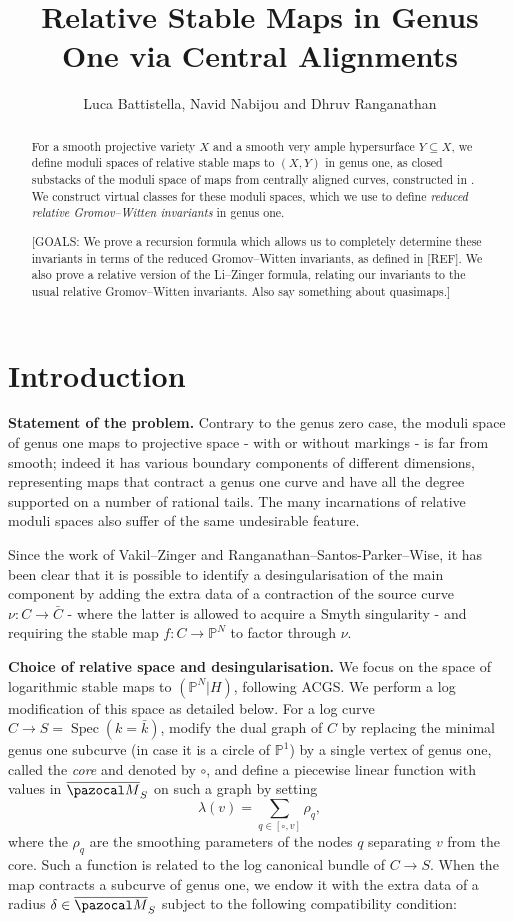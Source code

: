 \documentclass[11pt]{amsart}
\title[Genus One Reduced Relative Invariants]{Relative Stable Maps in Genus One via Central Alignments}
\author{Luca Battistella, Navid Nabijou and Dhruv Ranganathan}
\date{\thismonthyear}
\newcommand{\PP}{\mathbb P}
\renewcommand{\to}{\rightarrow}
\newcommand{\Spec}{\operatorname{Spec}}
\theoremstyle{definition}
\theoremstyle{definition}
\begin{document}
\begin{abstract} For a smooth projective variety $X$ and a smooth very ample hypersurface $Y \subseteq X$, we define moduli spaces of relative stable maps to $(X,Y)$ in genus one, as closed substacks of the moduli space of maps from centrally aligned curves, constructed in \cite{RSPW}. We construct virtual classes for these moduli spaces, which we use to define \emph{reduced relative Gromov--Witten invariants} in genus one.

[GOALS: We prove a recursion formula which allows us to completely determine these invariants in terms of the reduced Gromov--Witten invariants, as defined in [REF]. We also prove a relative version of the Li--Zinger formula, relating our invariants to the usual relative Gromov--Witten invariants. Also say something about quasimaps.]
\end{abstract}

\maketitle

\appendixtitletocoff
\tableofcontents

\section{Introduction}

\textbf{Statement of the problem.} Contrary to the genus zero case, the moduli space of genus one maps to projective space - with or without markings - is far from smooth; indeed it has various boundary components of different dimensions, representing maps that contract a genus one curve and have all the degree supported on a number of rational tails. The many incarnations of relative moduli spaces also suffer of the same undesirable feature.

Since the work of Vakil--Zinger and Ranganathan--Santos-Parker--Wise, it has been clear that it is possible to identify a desingularisation of the main component by adding the extra data of a contraction of the source curve $\nu\colon C\to \bar{C}$ - where the latter is allowed to acquire a Smyth singularity - and requiring the stable map $f\colon C\to \PP^N$ to factor through $\nu$.

\textbf{Choice of relative space and desingularisation.} We focus on the space of logarithmic stable maps to $(\PP^N|H)$, following ACGS. We perform a log modification of this space as detailed below. For a log curve $C\to S=\Spec(k=\bar k)$, modify the dual graph of $C$ by replacing the minimal genus one subcurve (in case it is a circle of $\PP^1$) by a single vertex of genus one, called the \emph{core} and denoted by $\circ$, and define a piecewise linear function with values in $\overline{\pazocal M}_S$ on such a graph by setting \[\lambda(v)=\sum_{q\in[\circ,v]}\rho_q,\]
where the $\rho_q$ are the smoothing parameters of the nodes $q$ separating $v$ from the core. Such a function is related to the log canonical bundle of $C\to S$. When the map contracts a subcurve of genus one, we endow it with the extra data of a radius $\delta\in\overline{\pazocal M}_S$ subject to the following compatibility condition:
\end{document}
